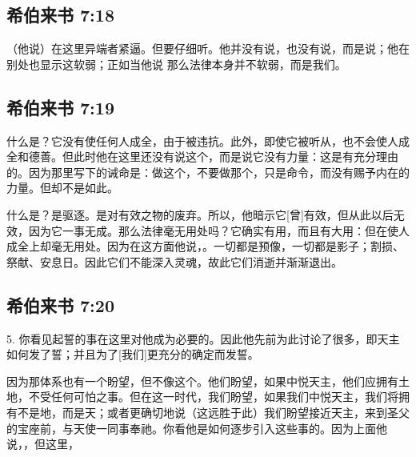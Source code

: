 
\subsection{希伯来书 7:18}

（他说）在这里异端者紧逼。但要仔细听。他并没有说，也没有说，而是说；他在别处也显示这软弱；正如当他说 那么法律本身并不软弱，而是我们。\par


\subsection{希伯来书 7:19}

 什么是？它没有使任何人成全，由于被违抗。此外，即使它被听从，也不会使人成全和德善。但此时他在这里还没有说这个，而是说它没有力量：这是有充分理由的。因为那里写下的诫命是：做这个，不要做那个，只是命令，而没有赐予内在的力量。但却不是如此。\par

什么是？是驱逐。是对有效之物的废弃。所以，他暗示它[曾]有效，但从此以后无效，因为它一事无成。那么法律毫无用处吗？它确实有用，而且有大用：但在使人成全上却毫无用处。因为在这方面他说，。一切都是预像，一切都是影子；割损、祭献、安息日。因此它们不能深入灵魂，故此它们消逝并渐渐退出。\par


\subsection{希伯来书 7:20}

5. 你看见起誓的事在这里对他成为必要的。因此他先前为此讨论了很多，即天主如何发了誓；并且为了[我们]更充分的确定而发誓。\par

因为那体系也有一个盼望，但不像这个。他们盼望，如果中悦天主，他们应拥有土地，不受任何可怕之事。但在这一时代，我们盼望，如果我们中悦天主，我们将拥有不是地，而是天；或者更确切地说（这远胜于此）我们盼望接近天主，来到圣父的宝座前，与天使一同事奉祂。你看他是如何逐步引入这些事的。因为上面他说，，但这里，\par

